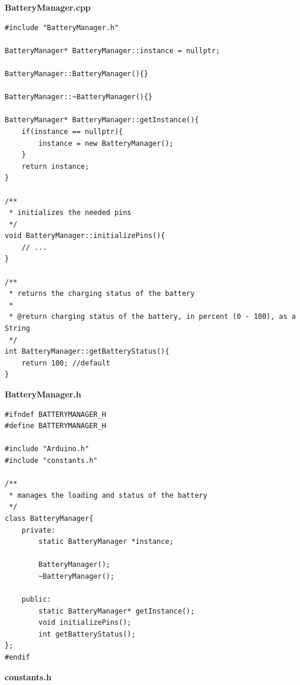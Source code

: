 \documentclass[11pt, twoside]{article}
\begin{document}
\textbf{BatteryManager.cpp}

\begin{lstlisting}
#include "BatteryManager.h"

BatteryManager* BatteryManager::instance = nullptr;

BatteryManager::BatteryManager(){}

BatteryManager::~BatteryManager(){}

BatteryManager* BatteryManager::getInstance(){
    if(instance == nullptr){
        instance = new BatteryManager();
    }
    return instance;
}

/**
 * initializes the needed pins
 */
void BatteryManager::initializePins(){
    // ...
}

/**
 * returns the charging status of the battery
 * 
 * @return charging status of the battery, in percent (0 - 100), as a String
 */
int BatteryManager::getBatteryStatus(){
    return 100; //default
}\end{lstlisting}

\textbf{BatteryManager.h}

\begin{lstlisting}
#ifndef BATTERYMANAGER_H
#define BATTERYMANAGER_H

#include "Arduino.h"
#include "constants.h"

/**
 * manages the loading and status of the battery
 */
class BatteryManager{
    private:
        static BatteryManager *instance;

        BatteryManager();
        ~BatteryManager();

    public:
        static BatteryManager* getInstance();
        void initializePins();
        int getBatteryStatus();
};
#endif\end{lstlisting}

\textbf{constants.h}
\end{document}

